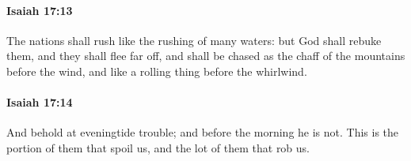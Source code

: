 		\paragraph{Isaiah 17:13} %
			\label{ISAIAH-17-13}

			The nations shall rush like the rushing of many waters: but God shall rebuke them, and they shall flee far off, and shall be chased as the chaff of the mountains before the wind, and like a rolling thing before the whirlwind.


		\paragraph{Isaiah 17:14} %
			\label{ISAIAH-17-14}

			And behold at eveningtide trouble; and before the morning he is not. This is the portion of them that spoil us, and the lot of them that rob us.

